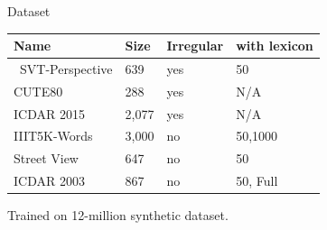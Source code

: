 \documentclass[compress]{beamer}
\begin{document}
\begin{frame}{Dataset}
    \begin{table}
        \centering
        \begin{tabular}{llll}
            Name            & Size  & Irregular & with lexicon \\ \hline\hline
            \
            SVT-Perspective & 639   & yes       & 50           \\ \hline
            CUTE80          & 288   & yes       & N/A          \\ \hline
            ICDAR 2015      & 2,077 & yes       & N/A          \\ \hline
            IIIT5K-Words    & 3,000 & no        & 50,1000      \\ \hline
            Street View     & 647   & no        & 50           \\ \hline
            ICDAR 2003      & 867   & no        & 50, Full     \\ \hline
        \end{tabular}
    \end{table}
    Trained on 12-million synthetic dataset.
\end{frame}
\end{document}
